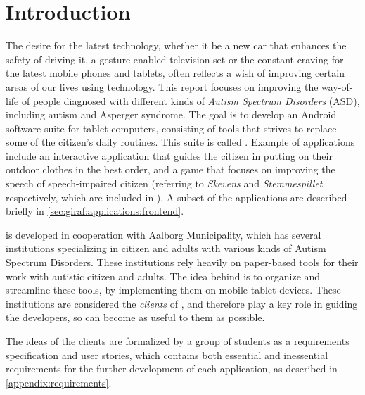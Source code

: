 \newcommand{\headerIntroduction}{Introduction}
\chapter*{\headerIntroduction}\label{chap:introduction}
\addcontentsline{toc}{chapter}{\headerIntroduction}

The desire for the latest technology, whether it be a new car that enhances the safety of driving it, a gesture enabled television set or the constant craving for the latest mobile phones and tablets, often reflects a wish of improving certain areas of our lives using technology.
This report focuses on improving the way-of-life of people diagnosed with different kinds of \textit{Autism Spectrum Disorders} (ASD), including autism and Asperger syndrome.
The goal is to develop an Android software suite for tablet computers, consisting of tools that strives to replace some of the citizen's daily routines. This suite is called \giraf.
Example of \giraf applications include an interactive application that guides the citizen in putting on their outdoor clothes in the best order, and a game that focuses on improving the speech of speech-impaired citizen (referring to \textit{Skevens} and \textit{Stemmespillet} respectively, which are included in \giraf).
A subset of the \giraf applications are described briefly in \cref{sec:giraf:applications:frontend}.

\giraf is developed in cooperation with Aalborg Municipality, which has several institutions specializing in citizen and adults with various kinds of Autism Spectrum Disorders.
These institutions rely heavily on paper-based tools for their work with autistic citizen and adults. 
The idea behind \giraf is to organize and streamline these tools, by implementing them on mobile tablet devices.
These institutions are considered the \textit{clients} of \giraf, and therefore play a key role in guiding the developers, so \giraf can become as useful to them as possible.

The ideas of the clients are formalized by a group of students as a requirements specification and user stories, which contains both essential and inessential requirements for the further development of each application, as described in \cref{appendix:requirements}.
